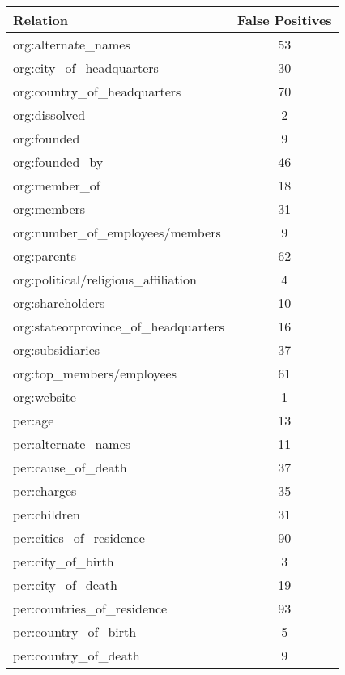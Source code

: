 \documentclass[11pt,a4paper]{article}
\begin{document}
\begin{table}[t]
	\centering
	\begin{tabular}{lc}
		\toprule
		{Relation} & {False Positives}   \\ 
		\midrule
		org:alternate\_names                  & 53 \\
		org:city\_of\_headquarters            & 30 \\
		org:country\_of\_headquarters         & 70 \\
		org:dissolved                         & 2  \\
		org:founded                           & 9  \\
		org:founded\_by                       & 46 \\
		org:member\_of                        & 18 \\
		org:members                           & 31 \\
		org:number\_of\_employees/members     & 9  \\
		org:parents                           & 62 \\
		org:political/religious\_affiliation  & 4  \\
		org:shareholders                      & 10 \\
		org:stateorprovince\_of\_headquarters & 16 \\
		org:subsidiaries                      & 37 \\
		org:top\_members/employees            & 61 \\
		org:website                           & 1  \\
		per:age                               & 13 \\
		per:alternate\_names                  & 11 \\
		per:cause\_of\_death                  & 37 \\
		per:charges                           & 35 \\
		per:children                          & 31 \\
		per:cities\_of\_residence             & 90 \\
		per:city\_of\_birth                   & 3  \\
		per:city\_of\_death                   & 19 \\
		per:countries\_of\_residence          & 93 \\
		per:country\_of\_birth                & 5  \\
		per:country\_of\_death                & 9  \\

\end{tabular}
\end{table}
\end{document}

